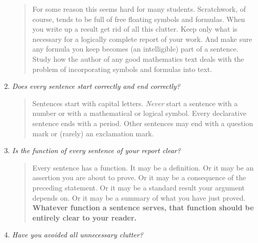 \begin{enumerate}
\vspace{10pt}


     \begin{quote}
For some reason this seems hard for many students.  Scratchwork, of course, tends to be full
of free floating symbols and formulas. When you write up a result get rid of all this clutter.
Keep only what is necessary for a logically complete report of your work. And make sure any
formula you keep becomes (an intelligible) part of a sentence.  Study how the author of any
good mathematics text deals with the problem of incorporating symbols and formulas into text.
     \end{quote}

\vspace{15pt}

   \item \emph{Does every sentence start correctly and end correctly?}

\vspace{10pt}

     \begin{quote}
Sentences start with capital letters.  \emph{Never} start a sentence with a number or with a
mathematical or logical symbol. Every declarative sentence ends with a period.  Other
sentences may end with a question mark or (rarely) an exclamation mark.
     \end{quote}

\vspace{15pt}

   \item \emph{Is the \emph{function} of every sentence of your report clear?}

\vspace{10pt}

     \begin{quote}
Every sentence has a function.  It may be a definition.  Or it may be an assertion you are
about to prove.  Or it may be a consequence of the preceding statement.  Or it may be a
standard result your argument depends on.  Or it may be a summary of what you have just
proved.  \textbf{Whatever function a sentence serves, that function should be entirely clear
to your reader.}
     \end{quote}

\vspace{15pt}

   \item \emph{Have you avoided all unnecessary clutter?}

\vspace{10pt}


\end{enumerate}
